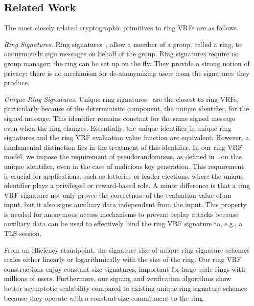 
\subsection{Related Work}

The most closely related cryptographic primitives to ring VRFs are as follows.

\smallskip
\noindent\textit{Ring Signatures.} Ring signatures~\cite{RivestST01}, allow a member of a group, called a ring, to anonymously sign messages on behalf of the group.  Ring signatures require no group manager; the ring can be set up on the fly.  They provide a strong notion of privacy: there is no mechanism for de-anonymizing users from the signatures they produce. 

\smallskip
\noindent\textit{Unique Ring Signatures.} Unique ring signatures~ \cite{URCframework} are the closest to ring VRFs, particularly because of the deterministic component, the unique identifier, for the signed message. This identifier remains constant for the same signed message even when the ring changes.  Essentially, the unique identifier in unique ring signatures and the ring VRF evaluation value function are equivalent. However, a fundamental distinction lies in the treatment of this identifier. In our ring VRF model, we impose the requirement of pseudorandomness, as defined in \cite{ucvrf,praos}, on this unique identifier, even in the case of malicious key generation.
This requirement is crucial for applications, such as lotteries or leader elections, where the unique identifier plays a privileged or reward-based role. 
A minor difference is that a ring VRF signature not only proves the correctness of the evaluation value of an input, but it also signs auxiliary data independent from the input. This property is needed for anonymous access mechanisms to prevent replay attacks because auxiliary data can be used to effectively bind the ring VRF signature to, e.g., a TLS session.

From an efficiency standpoint, the signature size of unique ring signature schemes scales either linearly \cite{URCframework,URCfc} or logarithmically  \cite{URCblockchainprivacy,URClattice} with the size of the ring. Our ring VRF constructions enjoy constant-size signatures, important for large-scale rings with millions of users.  Furthermore, our signing and verification algorithms show better asymptotic scalability compared to existing unique ring signature schemes because they operate with a constant-size commitment to the ring.

